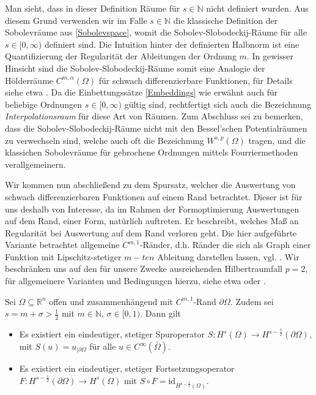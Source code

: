 Man sieht, dass in dieser Definition Räume für $s\in\mathbb{N}$ nicht definiert wurden. Aus diesem Grund verwenden wir im Falle $s\in\mathbb{N}$ die klassische Definition der Sobolevräume aus \ref{Sobolevspace}, womit die Sobolev-Slobodeckij-Räume für alle $s\in[0,\infty)$
definiert sind. Die Intuition hinter der definierten Halbnorm ist eine Quantifizierung der Regularität der Ableitungen der Ordnung $m$. In gewisser Hinsicht sind die Sobolev-Slobodeckij-Räume somit eine Analogie der Hölderräume $C^{m, \alpha}(\Omega)$ für schwach differenzierbare Funktionen, für Details siehe etwa \cite{brokenSobolev}. Da die Einbettungssätze \ref{Embeddings} wie erwähnt auch für beliebige Ordnungen $s\in[0,\infty)$ gültig sind, rechtfertigt sich auch die Bezeichnung \textit{Interpolationsraum} für diese Art von Räumen. Zum Abschluss sei zu bemerken, dass die Sobolev-Slobodeckij-Räume nicht mit den Bessel'schen Potentialräumen zu verwechseln sind, welche auch oft die Bezeichnung $W^{s,p}(\Omega)$ tragen, und die klassichen Sobolevräume für gebrochene Ordnungen mittels Fourriermethoden verallgemeinern.

Wir kommen nun abschließend zu dem Spursatz, welcher die Auswertung von schwach differenzierbaren Funktionen auf einem Rand betrachtet. Dieser ist für uns deshalb von Interesse, da im Rahmen der Formoptimierung Auswertungen auf dem Rand, einer Form, natürlich auftreten. Er beschreibt, welches Maß an Regularität bei Auswertung auf dem Rand verloren geht. Die hier aufgeführte Variante betrachtet allgemeine $C^{m,1}$-Ränder, d.h. Ränder die sich als Graph einer Funktion mit Lipschitz-stetiger $m-ten$ Ableitung darstellen lassen, vgl. \cite{brokenSobolev}. Wir beschränken uns auf den für unsere Zwecke ausreichenden Hilbertraumfall $p=2$, für allgemeinere Varianten und Bedingungen hierzu, siehe etwa \cite{tracetheorem} oder \cite{brokenSobolev}.


\begin{theorem}[Spursatz]
\label{tracetheorem}
	Sei $\Omega \subseteq \mathbb{R}^n$ offen und zusammenhängend mit $C^{m,1}$-Rand $\partial\Omega$.
	Zudem sei $s = m + \sigma > \frac{1}{2}$ mit $m\in\mathbb{N}$, $\sigma\in[0,1)$. Dann gilt
	\begin{itemize}
		\item[(i)]	Es existiert ein eindeutiger, stetiger Spuroperator $S: H^{s}(\Omega) \rightarrow H^{s-\frac{1}{2}}(\partial\Omega)$, mit $S(u) = u_{\vert \partial \Omega}$ für alle $u\in C^\infty(\bar{\Omega})$.
		\item[(ii)] Es existiert ein eindeutiger, stetiger Fortsetzungsoperator \newline $F: H^{s-\frac{1}{2}}(\partial\Omega) \rightarrow  H^{s}(\Omega)$ mit $S\circ F = \text{id}_{H^{s-\frac{1}{2}}(\Omega)}$.
	\end{itemize}
\end{theorem}

